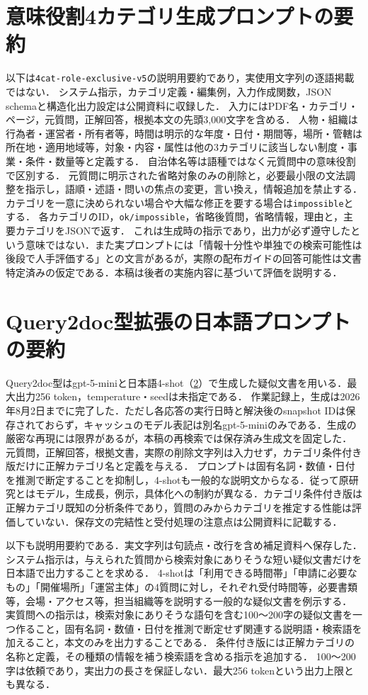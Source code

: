 \documentclass[twocolumn,a4paper,10pt]{ltjsarticle}
\begin{document}
\section{意味役割4カテゴリ生成プロンプトの要約}
\label{app:prompt}
以下は\texttt{4cat-role-exclusive-v5}の説明用要約であり，実使用文字列の逐語掲載ではない．
システム指示，カテゴリ定義・編集例，入力作成関数，JSON schemaと構造化出力設定は公開資料に収録した．
入力にはPDF名・カテゴリ・ページ，元質問，正解回答，根拠本文の先頭3,000文字を含める．
人物・組織は行為者・運営者・所有者等，時間は明示的な年度・日付・期間等，場所・管轄は所在地・適用地域等，対象・内容・属性は他の3カテゴリに該当しない制度・事業・条件・数量等と定義する．
自治体名等は語種ではなく元質問中の意味役割で区別する．
元質問に明示された省略対象のみの削除と，必要最小限の文法調整を指示し，語順・述語・問いの焦点の変更，言い換え，情報追加を禁止する．
カテゴリを一意に決められない場合や大幅な修正を要する場合は\texttt{impossible}とする．
各カテゴリのID，\texttt{ok/impossible}，省略後質問，省略情報，理由と，主要カテゴリをJSONで返す．
これは生成時の指示であり，出力が必ず遵守したという意味ではない．また実プロンプトには「情報十分性や単独での検索可能性は後段で人手評価する」との文言があるが，実際の配布ガイドの回答可能性は文書特定済みの仮定である．本稿は後者の実施内容に基づいて評価を説明する．

\section{Query2doc型拡張の日本語プロンプトの要約}
\label{app:q2d}
Query2doc型はgpt-5-miniと日本語4-shot（\ref{app:q2d}）で生成した疑似文書を用いる．最大出力256 token，temperature・seedは未指定である．
作業記録上，生成は2026年8月2日までに完了した．ただし各応答の実行日時と解決後のsnapshot IDは保存されておらず，キャッシュのモデル表記は別名gpt-5-miniのみである．生成の厳密な再現には限界があるが，本稿の再検索では保存済み生成文を固定した．
元質問，正解回答，根拠文書，実際の削除文字列は入力せず，カテゴリ条件付き版だけに正解カテゴリ名と定義を与える．
プロンプトは固有名詞・数値・日付を推測で断定することを抑制し，4-shotも一般的な説明文からなる．従って原研究\cite{wang2023query2doc}とはモデル，生成長，例示，具体化への制約が異なる．カテゴリ条件付き版は正解カテゴリ既知の分析条件であり，質問のみからカテゴリを推定する性能は評価していない．保存文の完結性と受付処理の注意点は公開資料に記載する．

以下も説明用要約である．実文字列は句読点・改行を含め補足資料へ保存した．
システム指示は，与えられた質問から検索対象にありそうな短い疑似文書だけを日本語で出力することを求める．
4-shotは「利用できる時間帯」「申請に必要なもの」「開催場所」「運営主体」の4質問に対し，それぞれ受付時間等，必要書類等，会場・アクセス等，担当組織等を説明する一般的な疑似文書を例示する．
実質問への指示は，検索対象にありそうな語句を含む100〜200字の疑似文書を一つ作ること，固有名詞・数値・日付を推測で断定せず関連する説明語・検索語を加えること，本文のみを出力することである．
条件付き版には正解カテゴリの名称と定義，その種類の情報を補う検索語を含める指示を追加する．
100〜200字は依頼であり，実出力の長さを保証しない．最大256 tokenという出力上限とも異なる．
\end{document}
